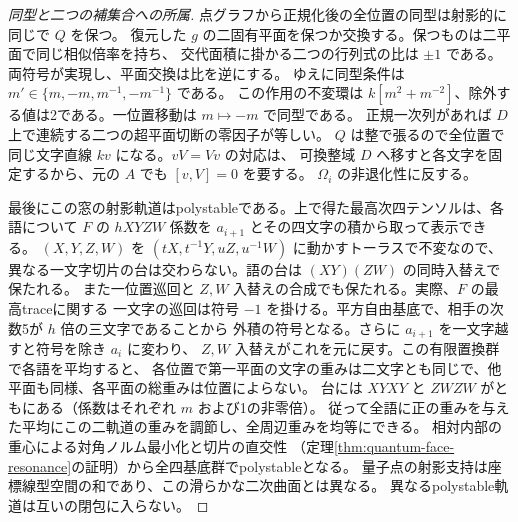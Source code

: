 \begin{proof}[同型と二つの補集合への所属]
点グラフから正規化後の全位置の同型は射影的に同じで $Q$ を保つ。
復元した $g$ の二固有平面を保つか交換する。保つものは二平面で同じ相似倍率を持ち、
交代面積に掛かる二つの行列式の比は $\pm1$ である。両符号が実現し、平面交換は比を逆にする。
ゆえに同型条件は $m'\in\{m,-m,m^{-1},-m^{-1}\}$ である。
この作用の不変環は $k[m^2+m^{-2}]$、除外する値は2である。一位置移動は $m\mapsto-m$ で同型である。
正規一次列があれば $D$ 上で連続する二つの超平面切断の零因子が等しい。
$Q$ は整で張るので全位置で同じ文字直線 $kv$ になる。$v V=V v$ の対応は、
可換整域 $D$ へ移すと各文字を固定するから、元の $A$ でも $[v,V]=0$ を要する。
$\Omega_i$ の非退化性に反する。

最後にこの窓の射影軌道はpolystableである。上で得た最高次四テンソルは、各語について
$F$ の $hXYZW$ 係数を $a_{i+1}$ とその四文字の積から取って表示できる。
$(X,Y,Z,W)$ を $(tX,t^{-1}Y,uZ,u^{-1}W)$ に動かすトーラスで不変なので、
異なる一文字切片の台は交わらない。語の台は $(XY)(ZW)$ の同時入替えで保たれる。
また一位置巡回と $Z,W$ 入替えの合成でも保たれる。実際、$F$ の最高traceに関する
一文字の巡回は符号 $-1$ を掛ける。平方自由基底で、相手の次数5が $h$ 倍の三文字であることから
外積の符号となる。さらに $a_{i+1}$ を一文字越すと符号を除き $a_i$ に変わり、
$Z,W$ 入替えがこれを元に戻す。この有限置換群で各語を平均すると、
各位置で第一平面の文字の重みは二文字とも同じで、他平面も同様、各平面の総重みは位置によらない。
台には $XYXY$ と $ZWZW$ がともにある（係数はそれぞれ $m$ および1の非零倍）。
従って全語に正の重みを与えた平均にこの二軌道の重みを調節し、全周辺重みを均等にできる。
相対内部の重心による対角ノルム最小化と切片の直交性
（定理\ref{thm:quantum-face-resonance}の証明）から全四基底群でpolystableとなる。
量子点の射影支持は座標線型空間の和であり、この滑らかな二次曲面とは異なる。
異なるpolystable軌道は互いの閉包に入らない。
\end{proof}
